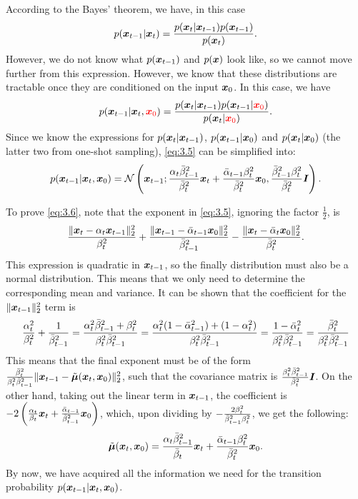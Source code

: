 According to the Bayes' theorem, we have, in this case
\begin{equation}
    \label{eq:3.4}
    p(\bm{x}_{t-1}|\bm{x}_{t})=\frac{p(\bm{x}_{t}|\bm{x}_{t-1})p(\bm{x}_{t-1})}{p(\bm{x}_{t})}.
\end{equation}
However, we do not know what $p(\bm{x}_{t-1})$ and $p(\bm{x})$ look like, so we cannot move further from this expression. However, we know that these distributions are tractable once they are conditioned on the input $\bm{x}_0$. In this case, we have
\begin{equation}
    \label{eq:3.5}
    p(\bm{x}_{t-1}|\bm{x}_{t},\textcolor{red}{\bm{x}_0})=\frac{p(\bm{x}_{t}|\bm{x}_{t-1})p(\bm{x}_{t-1}|\textcolor{red}{\bm{x}_0})}{p(\bm{x}_{t}|\textcolor{red}{\bm{x}_0})}.
\end{equation}
Since we know the expressions for $p(\bm{x}_{t}|\bm{x}_{t-1})$, $p(\bm{x}_{t-1}|\bm{x}_0)$ and $p(\bm{x}_{t}|\bm{x}_0)$ (the latter two from one-shot sampling), \cref{eq:3.5} can be simplified into:
\textcolor{red}{
\begin{equation}
    \label{eq:3.6}
    p(\bm{x}_{t-1}|\bm{x}_{t},\bm{x}_0)=\mathcal{N}\left(\bm{x}_{t-1}; \frac{\alpha_t\bar{\beta}_{t-1}^2}{\bar{\beta}_t^2}\bm{x}_{t}+\frac{\bar{\alpha}_{t-1}\beta_t^2}{\bar{\beta}_t^2}\bm{x}_0,\frac{\bar{\beta}_{t-1}^2\beta_t^2}{\bar{\beta}_t^2}\bm{I}  \right).
\end{equation}
}
\begin{myquote}
\footnotesize{
To prove \cref{eq:3.6}, note that the exponent in \cref{eq:3.5}, ignoring the factor $\frac{1}{2}$, is
\begin{equation}\label{eq:3.7}
    \frac{\|\bm{x}_{t}-\alpha_t\bm{x}_{t-1}\|_2^2}{\beta_t^2}+ \frac{\|\bm{x}_{t-1}-\bar{\alpha}_{t-1}\bm{x}_0\|_2^2}{\bar{\beta}_{t-1}^2} -  \frac{\|\bm{x}_{t}-\bar{\alpha}_t\bm{x}_0\|_2^2}{\bar{\beta}_t^2}.
\end{equation}
This expression is quadratic in $\bm{x}_{t-1}$, so the finally distribution must also be a normal distribution. This means that we only need to determine the corresponding mean and variance. It can be shown that the coefficient for the $\|\bm{x}_{t-1}\|_2^2$ term is
\begin{equation}
    \label{eq:3.8}
    \frac{\alpha_t^2}{\beta_t^2}+\frac{1}{\bar{\beta}_{t-1}^2}=\frac{\alpha_t^2\bar{\beta}_{t-1}^2+\beta_t^2}{\beta_t^2\bar{\beta}_{t-1}^2}=\frac{\alpha_t^2(1-\bar{\alpha}_{t-1}^2)+(1-\alpha_t^2)}{\beta_t^2\bar{\beta}_{t-1}^2}=\frac{1-\bar{\alpha}_t^2}{\beta_t^2\bar{\beta}_{t-1}^2}=\frac{\bar{\beta}_t^2}{\beta_t^2\bar{\beta}_{t-1}^2}
\end{equation}
This means that the final exponent must be of the form $\frac{\bar{\beta}_t^2}{\beta_t^2\bar{\beta}_{t-1}^2}\|\bm{x}_{t-1}-\tilde{\bm{\mu}}(\bm{x}_{t},\bm{x}_0)\|_2^2$, such that the covariance matrix is $\frac{\beta_t^2\bar{\beta}_{t-1}^2}{\bar{\beta}_t^2}\bm{I}$. On the other hand, taking out the linear term in $\bm{x}_{t-1}$, the coefficient is $-2\left(\frac{\alpha_t}{\beta_t}\bm{x}_{t}+\frac{\bar{\alpha}_{t-1}}{\bar{\beta}_{t-1}^2}\bm{x}_0\right)$, which, upon dividing by $-\frac{2\beta_t^2}{\bar{\beta}_{t-1}^2\beta_t^2}$, we get the following:
\begin{equation}
    \label{eq:3.9}
    \tilde{\bm{\mu}}(\bm{x}_{t},\bm{x}_0)= \frac{\alpha_t\bar{\beta}_{t-1}^2}{\bar{\beta}_t}\bm{x}_{t}+\frac{\bar{\alpha}_{t-1}\beta_t^2}{\bar{\beta}_t^2}\bm{x}_0.
\end{equation}
By now, we have acquired all the information we need for the transition probability $p(\bm{x}_{t-1}|\bm{x}_{t},\bm{x}_0)$.
}
\end{myquote}

